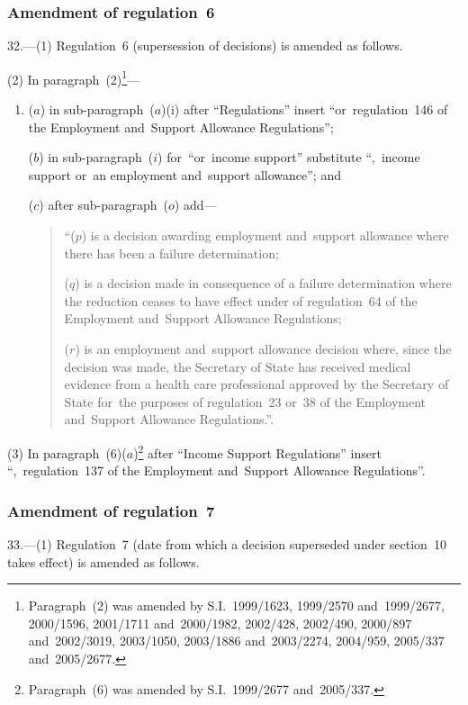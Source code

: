 \documentclass[12pt,a4paper]{article}
\begin{document}
\subsubsection[32. Amendment of regulation~6]{Amendment of regulation~6}

32.---(1)  Regulation~6 (supersession of decisions) is amended as follows.

(2) In paragraph~(2)\footnote{Paragraph~(2) was amended by S.I.~1999/1623, 1999/2570 and~1999/2677, 2000/1596, 2001/1711 and~2000/1982, 2002/428, 2002/490, 2000/897 and~2002/3019, 2003/1050, 2003/1886 and~2003/2274, 2004/959, 2005/337 and~2005/2677.}—
\begin{enumerate}\item[]
($a$) in sub-paragraph~($a$)(i)  after “Regulations” insert “or~regulation~146 of the Employment and~Support Allowance Regulations”;

($b$) in sub-paragraph~($i$)  for~“or~income support” substitute “,~income support or~an employment and~support allowance”; and

($c$) after sub-paragraph~($o$)  add—
\begin{quotation}
“($p$) is a decision awarding employment and~support allowance where there has been a failure determination;

($q$) is a decision made in consequence of a failure determination where the reduction ceases to have effect under of regulation~64 of the Employment and~Support Allowance Regulations;

($r$) is an employment and~support allowance decision where, since the decision was made, the Secretary of State has received medical evidence from a health care professional approved by the Secretary of State for~the purposes of regulation~23 or~38 of the Employment and~Support Allowance Regulations.”.
\end{quotation}
\end{enumerate}

(3) In paragraph~(6)($a$)\footnote{Paragraph~(6) was amended by S.I.~1999/2677 and~2005/337.} after “Income Support Regulations” insert “,~regulation~137 of the Employment and~Support Allowance Regulations”.

\subsubsection[33. Amendment of regulation~7]{Amendment of regulation~7}

33.---(1)  Regulation~7 (date from which a decision superseded under section~10 takes effect) is amended as follows.
\end{document}
